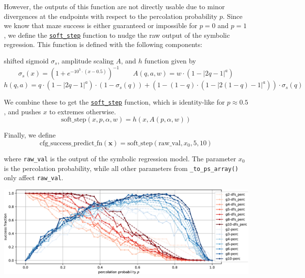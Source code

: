 \documentclass[10pt,a4paper,onecolumn]{article}
\let\origfigure\figure
\let\endorigfigure\endfigure
\renewenvironment{figure}[1][2] {
    \expandafter\origfigure\expandafter[H]
} {
    \endorigfigure
}
\begin{document}
However, the outputs of this function are not directly usable due to
minor divergences at the endpoints with respect to the percolation
probability \(p\). Since we know that maze success is either guaranteed
or impossible for \(p=0\) and \(p=1\), we define the
\href{https://understanding-search.github.io/maze-dataset/maze_dataset/dataset/success_predict_math.html\#soft_step}{\texttt{soft\_step}}
function to nudge the raw output of the symbolic regression. This
function is defined with the following components:

shifted sigmoid \(\sigma_s\), amplitude scaling \(A\), and \(h\)
function given by \[
  \sigma_s(x) = (1 + e^{-10^3 \cdot (x-0.5)})^{-1}
  \qquad A(q,a,w) = w \cdot (1 - |2q-1|^a)
\] \[
  h(q,a) = q \cdot (1 - |2q-1|^a) \cdot (1-\sigma_s(q)) + (1-(1-q) \cdot (1 - |2(1-q)-1|^a)) \cdot \sigma_s(q)
\]

We combine these to get the
\href{https://understanding-search.github.io/maze-dataset/maze_dataset/dataset/success_predict_math.html\#soft_step}{\texttt{soft\_step}}
function, which is identity-like for \(p \approx 0.5\), and pushes \(x\)
to extremes otherwise. \[
  \text{soft\_step}(x, p, \alpha, w) = h(x, A(p, \alpha, w))
\]

Finally, we define \[
  \text{cfg\_success\_predict\_fn}(\mathbf{x}) = \text{soft\_step}(\text{raw\_val}, x_0, 5, 10)
\]

where \texttt{raw\_val} is the output of the symbolic regression model.
The parameter \(x_0\) is the percolation probability, while all other
parameters from \texttt{\_to\_ps\_array()} only affect
\texttt{raw\_val}.

\begin{figure}
\centering
\includegraphics[width=1\textwidth,height=\textheight]{figures/ep/ep_deadends_unique-crop.pdf}
\caption{An example of both empirical and predicted success rates as a
function of the percolation probability \(p\) for various maze sizes,
percolation with and without depth first search, and
\texttt{endpoint\_kwargs} requiring that both the start and end be in
unique dead ends. Empirical measures derived from a sample of 128 mazes.
More information can be found on the
\href{https://understanding-search.github.io/maze-dataset/benchmarks/}{benchmarks
page}.}
\end{figure}
\end{document}
